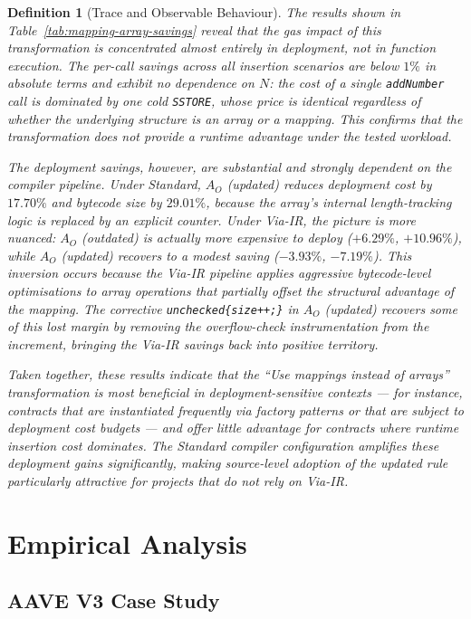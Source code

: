\documentclass[manuscript,screen,review]{acmart}
\newtheorem{definition}{Definition}
\begin{document}
\begin{definition}[Trace and Observable Behaviour]
The results shown in Table~\ref{tab:mapping-array-savings} reveal that the gas impact of this transformation is concentrated almost entirely in \emph{deployment}, not in function execution. The per-call savings across all insertion scenarios are below $1\%$ in absolute terms and exhibit no dependence on $N$: the cost of a single \texttt{addNumber} call is dominated by one cold \texttt{SSTORE}, whose price is identical regardless of whether the underlying structure is an array or a mapping. This confirms that the transformation does not provide a runtime advantage under the tested workload.

The deployment savings, however, are substantial and strongly dependent on the compiler pipeline. Under Standard, $A_O$ (updated) reduces deployment cost by $17.70\%$ and bytecode size by $29.01\%$, because the array's internal length-tracking logic is replaced by an explicit counter. Under Via-IR, the picture is more nuanced: $A_O$ (outdated) is actually \emph{more expensive} to deploy ($+6.29\%$, $+10.96\%$), while $A_O$ (updated) recovers to a modest saving ($-3.93\%$, $-7.19\%$). This inversion occurs because the Via-IR pipeline applies aggressive bytecode-level optimisations to array operations that partially offset the structural advantage of the mapping. The corrective \texttt{unchecked\{size++;\}} in $A_O$ (updated) recovers some of this lost margin by removing the overflow-check instrumentation from the increment, bringing the Via-IR savings back into positive territory.

Taken together, these results indicate that the ``Use mappings instead of arrays'' transformation is most beneficial in \emph{deployment-sensitive} contexts --- for instance, contracts that are instantiated frequently via factory patterns or that are subject to deployment cost budgets --- and offer little advantage for contracts where runtime insertion cost dominates. The Standard compiler configuration amplifies these deployment gains significantly, making source-level adoption of the updated rule particularly attractive for projects that do not rely on Via-IR.

\section{Empirical Analysis}
\label{sec:empirical}

\subsection{AAVE V3 Case Study}


\end{definition}
\end{document}
